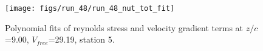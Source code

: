 \begin{figure}[H]
\centering
\texttt{[image: figs/run\_48/run\_48\_nut\_tot\_fit]}
\caption{Polynomial fits of reynolds stress and velocity gradient terms at $z/c$=9.00, $V_{free}$=29.19, station 5.}
\label{fig:run_48_nut_tot_fit}
\end{figure}


